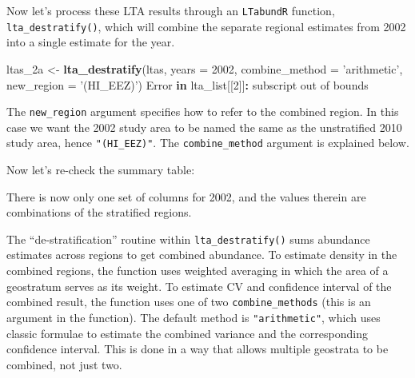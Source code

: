 \documentclass[
]{book}
\newenvironment{Shaded}{\begin{snugshade}}{\end{snugshade}}
\newcommand{\ControlFlowTok}[1]{\textcolor[rgb]{0.13,0.29,0.53}{\textbf{#1}}}
\newcommand{\DataTypeTok}[1]{\textcolor[rgb]{0.13,0.29,0.53}{#1}}
\newcommand{\DecValTok}[1]{\textcolor[rgb]{0.00,0.00,0.81}{#1}}
\newcommand{\KeywordTok}[1]{\textcolor[rgb]{0.13,0.29,0.53}{\textbf{#1}}}
\newcommand{\NormalTok}[1]{#1}
\newcommand{\OperatorTok}[1]{\textcolor[rgb]{0.81,0.36,0.00}{\textbf{#1}}}
\newcommand{\OtherTok}[1]{\textcolor[rgb]{0.56,0.35,0.01}{#1}}
\newcommand{\StringTok}[1]{\textcolor[rgb]{0.31,0.60,0.02}{#1}}
\begin{document}
Now let's process these LTA results through an \texttt{LTabundR} function, \texttt{lta\_destratify()}, which will combine the separate regional estimates from 2002 into a single estimate for the year.

\begin{Shaded}
\begin{Highlighting}[]
\NormalTok{ltas_2a <-}
\StringTok{  }\KeywordTok{lta_destratify}\NormalTok{(ltas,}
               \DataTypeTok{years =} \DecValTok{2002}\NormalTok{,}
               \DataTypeTok{combine_method =} \StringTok{'arithmetic'}\NormalTok{,}
               \DataTypeTok{new_region =} \StringTok{'(HI_EEZ)'}\NormalTok{)}
\NormalTok{Error }\ControlFlowTok{in}\NormalTok{ lta_list[[}\DecValTok{2}\NormalTok{]]}\OperatorTok{:}\StringTok{ }\NormalTok{subscript out of bounds}
\end{Highlighting}
\end{Shaded}

The \texttt{new\_region} argument specifies how to refer to the combined region. In this case we want the 2002 study area to be named the same as the unstratified 2010 study area, hence \texttt{"(HI\_EEZ)"}. The \texttt{combine\_method} argument is explained below.

Now let's re-check the summary table:

\begin{Shaded}
\end{Shaded}

There is now only one set of columns for 2002, and the values therein are combinations of the stratified regions.

The ``de-stratification'' routine within \texttt{lta\_destratify()} sums abundance estimates across regions to get combined abundance. To estimate density in the combined regions, the function uses weighted averaging in which the area of a geostratum serves as its weight. To estimate CV and confidence interval of the combined result, the function uses one of two \texttt{combine\_methods} (this is an argument in the function). The default method is \texttt{"arithmetic"}, which uses classic formulae to estimate the combined variance and the corresponding confidence interval. This is done in a way that allows multiple geostrata to be combined, not just two.
\end{document}
